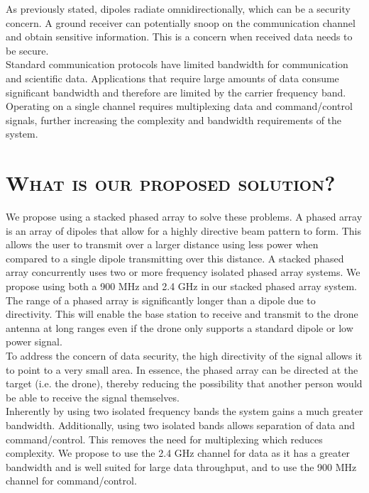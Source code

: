 \documentclass[11pt]{article}
\numberwithin{figure}{section}
\begin{document}
	As previously stated, dipoles radiate omnidirectionally, which can be a security concern.  A ground receiver can potentially snoop on the communication channel and obtain sensitive information.  This is a concern when received data needs to be secure.  \\

	Standard communication protocols have limited bandwidth for communication and scientific data.  Applications that require large amounts of data consume significant bandwidth and therefore are limited by the carrier frequency band.  Operating on a single channel requires multiplexing data and command/control signals, further increasing the complexity and bandwidth requirements of the system.  

	
\section{\textsc{What is our proposed solution?}}
	We propose using a stacked phased array to solve these problems.  A phased array is an array of dipoles that allow for a highly directive beam pattern to form.  This allows the user to transmit over a larger distance using less power when compared to a single dipole transmitting over this distance.  A stacked phased array concurrently uses two or more frequency isolated phased array systems.  We propose using both a 900 MHz and 2.4 GHz in our stacked phased array system. \\
	
	The range of a phased array is significantly longer than a dipole due to directivity.  This will enable the base station to receive and transmit to the drone antenna at long ranges even if the drone only supports a standard dipole or low power signal.  \\
	
	To address the concern of data security, the high directivity of the signal allows it to point to a very small area.  In essence, the phased array can be directed at the target (i.e. the drone), thereby reducing the possibility that another person would be able to receive the signal themselves.\\
	
	Inherently by using two isolated frequency bands the system gains a much greater bandwidth.  Additionally, using two isolated bands allows separation of data and command/control.  This removes the need for multiplexing which reduces complexity.  We propose to use the 2.4 GHz channel for data as it has a greater bandwidth and is well suited for large data throughput, and to use the 900 MHz channel for command/control.\\
\end{document}
